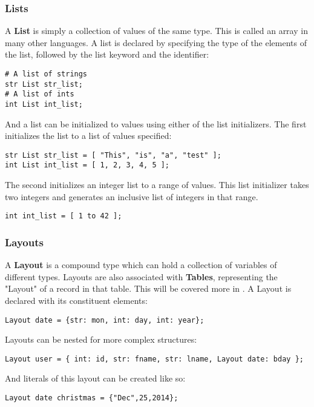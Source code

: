 \documentclass{article}
\begin{document}
\subsubsection{Lists}
A \textbf{List} is simply a collection of values of the same type. This is called an array in many other languages. A list is declared by specifying the type of the elements of the list, followed by the list keyword and the identifier:

\begin{lstlisting}
# A list of strings
str List str_list;
# A list of ints
int List int_list;
\end{lstlisting}

And a list can be initialized to values using either of the list initializers. The first initializes the list to a list of values specified:

\begin{lstlisting}
str List str_list = [ "This", "is", "a", "test" ]; 
int List int_list = [ 1, 2, 3, 4, 5 ];
\end{lstlisting}

The second initializes an integer list to a range of values. This list initializer takes two integers and generates an inclusive list of integers in that range.

\begin{lstlisting}
int int_list = [ 1 to 42 ];
\end{lstlisting}

\subsubsection{Layouts}
A \textbf{Layout} is a compound type which can hold a collection of variables of different types. Layouts are also associated with \textbf{Tables}, representing the "Layout" of a record in that table. This will be covered more in \label{sec:Tables}.
A Layout is declared with its constituent elements:

\begin{lstlisting}
Layout date = {str: mon, int: day, int: year};
\end{lstlisting}

Layouts can be nested for more complex structures:
\begin{lstlisting}
Layout user = { int: id, str: fname, str: lname, Layout date: bday };
\end{lstlisting}

And literals of this layout can be created like so:
\begin{lstlisting}
Layout date christmas = {"Dec",25,2014};
\end{lstlisting}
\end{document}
